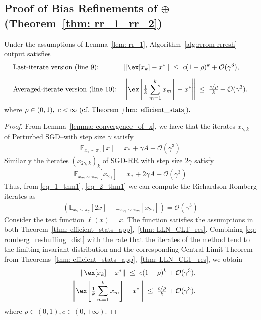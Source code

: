 \subsection{Proof of Bias Refinements of \RRresh$\oplus$\RRrom\\ (Theorem~\ref{thm: rr_1_rr_2})}
\begin{theorem}
Under the assumptions of Lemma~\ref{lem: rr_1}, Algorithm~\ref{alg:rrrom-rrresh} output satisfies
\[\begin{aligned}
&\text{Last-iterate version (line 9):} 
&& \|\ex[x_k]-x^*\|\;\le\;c(1-\rho)^k+\mathcal{O}(\gamma^3), \\[0.5em]
&\text{Averaged-iterate version (line 10):} 
&& \Biggl\|\ex\!\left[\tfrac{1}{k}\sum_{m=1}^k x_m\right]-x^*\Biggr\|\;\le\;\tfrac{c/\rho}{k}+\mathcal{O}(\gamma^3).
\end{aligned}\]
where $\rho\in(0,1),\;c<\infty \text{ (cf.\ Theorem~\ref{thm: efficient_stats}).}$
\end{theorem}

\begin{proof}
    From Lemma~\ref{lemma: convergence_of_x}, we have that the iterates $x_{\gamma, k}$ of Perturbed SGD--\RRresh with step size $\gamma$ satisfy
    \begin{eqnarray}
        \mathbb{E}_{x_{\gamma} \sim \pi_{\gamma}} [x] = x_* + \gamma A + \mathcal{O}\left(\gamma^3\right) \label{eq_1_thm1}
    \end{eqnarray}
    Similarly the iterates $(x_{2\gamma,k})_{k}$ of SGD-RR with step size $2\gamma$ satisfy
    \begin{eqnarray}
        \mathbb{E}_{x_{2\gamma} \sim \pi_{2\gamma}} [x_{2\gamma}] = x_* + 2\gamma A + \mathcal{O}\left(\gamma^3\right) \label{eq_2_thm1}
    \end{eqnarray}
    Thus, from \eqref{eq_1_thm1}, \eqref{eq_2_thm1} we can compute the Richardson Romberg iterates as
    \begin{eqnarray}
        \left(\mathbb{E}_{x_{\gamma} \sim \pi_{\gamma}} [2x]-\mathbb{E}_{x_{2\gamma} \sim \pi_{2\gamma}} [x_{2\gamma}]\right) = \mathcal{O}\left(\gamma^3\right) \label{eq: romberg_reshuffling_dist}
    \end{eqnarray}
    Consider the test function $\ell(x) = x$. The function satisfies the assumptions in both Theorem~\ref{thm: efficient_stats_app},~\ref{thm: LLN_CLT_res}. Combining \eqref{eq: romberg_reshuffling_dist} with the rate that the iterates of the method tend to the limiting invariant distribution and the corresponding Central Limit Theorem from Theorems~\ref{thm: efficient_stats_app},~\ref{thm: LLN_CLT_res}, we obtain
    \begin{eqnarray}
        && \|\ex[x_k]-x^*\|\;\le\;c(1-\rho)^k+\mathcal{O}(\gamma^3), \\
        && \Biggl\|\ex\!\left[\tfrac{1}{k}\sum_{m=1}^k x_m\right]-x^*\Biggr\|\;\le\;\tfrac{c/\rho}{k}+\mathcal{O}(\gamma^3).
    \end{eqnarray}
    where $\rho \in (0, 1), c\in(0, +\infty)$. 
\end{proof}

